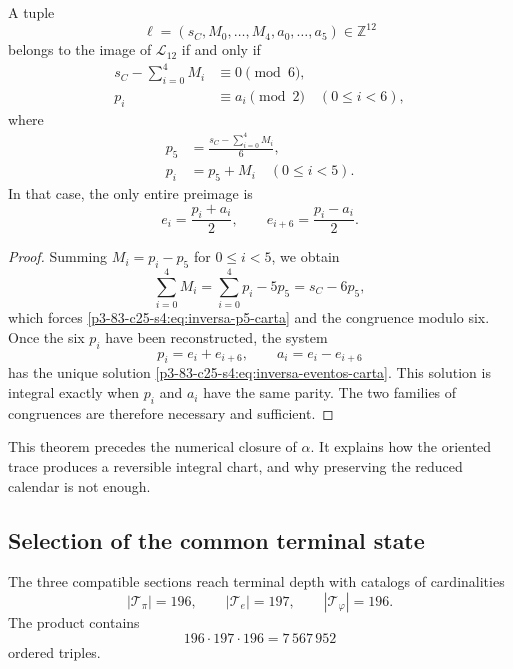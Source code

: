\begin{theorem}
\label{p3-83-c25-s4:thm:inversion-carta-integral-156}
A tuple
\[
 \ell=(s_C,M_0,\ldots,M_4,a_0,\ldots,a_5)\in\mathbb Z^{12}
\]
belongs to the image of \(\mathcal L_{12}\) if and only if
\begin{align}
 s_C-\sum_{i=0}^{4}M_i&\equiv0\pmod6,
 \label{p3-83-c25-s4:eq:congruencia-seis-carta}\\
 p_i&\equiv a_i\pmod2
 \quad(0\leq i<6),
 \label{p3-83-c25-s4:eq:congruencia-paridad-carta}
\end{align}
where
\begin{align}
 p_5&=\frac{s_C-\sum_{i=0}^{4}M_i}{6},
 \label{p3-83-c25-s4:eq:inversa-p5-carta}\\
 p_i&=p_5+M_i\quad(0\leq i<5).
 \label{p3-83-c25-s4:eq:inversa-pi-carta}
\end{align}
In that case, the only entire preimage is
\begin{equation}
 e_i=\frac{p_i+a_i}{2},
 \qquad
 e_{i+6}=\frac{p_i-a_i}{2}.
 \label{p3-83-c25-s4:eq:inversa-eventos-carta}
\end{equation}
\end{theorem}

\begin{proof}
Summing \(M_i=p_i-p_5\) for \(0\leq i<5\), we obtain
\[
 \sum_{i=0}^{4}M_i
 =\sum_{i=0}^{4}p_i-5p_5
 =s_C-6p_5,
\]
which forces \eqref{p3-83-c25-s4:eq:inversa-p5-carta} and the congruence modulo six.
Once the six \(p_i\) have been reconstructed, the system
\[
 p_i=e_i+e_{i+6},
 \qquad a_i=e_i-e_{i+6}
\]
has the unique solution \eqref{p3-83-c25-s4:eq:inversa-eventos-carta}. This solution is
integral exactly when \(p_i\) and \(a_i\) have the same parity.
The two families of congruences are therefore necessary and sufficient.
\end{proof}

This theorem precedes the numerical closure of \(\alpha\). It explains how the
oriented trace produces a reversible integral chart, and why preserving
the reduced calendar is not enough.

\subsection{Selection of the common terminal state}

The three compatible sections reach terminal depth with catalogs
of cardinalities
\[
 |\mathcal T_\pi|=196,
 \qquad
 |\mathcal T_e|=197,
 \qquad
 |\mathcal T_\varphi|=196.
\]
The product contains
\begin{equation}
 196\cdot197\cdot196=7\,567\,952
 \label{p3-83-c25-s4:eq:cardinal-producto-terminal}
\end{equation}
ordered triples.

